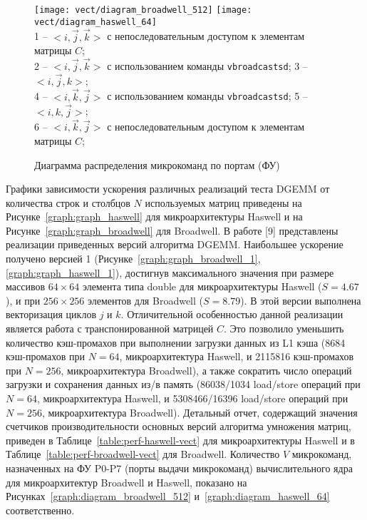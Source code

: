 \begin{figure}
	\centering
	{\texttt{[image: vect/diagram\_broadwell\_512]}}
	{\texttt{[image: vect/diagram\_haswell\_64]}} \\
	 1 -- $<i, \vec{j}, \vec{k}>$ с непоследовательным доступом к элементам матрицы $C$; \\
	 2 -- $<i, \vec{j}, \vec{k}>$ с использованием команды \texttt{vbroadcastsd}; 3 -- $<i, \vec{j}, k>$; \\
	 4 -- $<i, \vec{k}, \vec{j}>$ с использованием команды \texttt{vbroadcastsd}; 5 -- $<i, k, \vec{j}>$; \\
	 6 -- $<i, \vec{k}, \vec{j}>$ с непоследовательным доступом к элементам матрицы $C$;
    \caption{Диаграмма распределения микрокоманд по портам (ФУ)}
    \label{graph:vect-diagram}
\end{figure}

Графики зависимости ускорения различных реализаций теста DGEMM от количества строк и столбцов $N$ используемых матриц приведены на Рисунке~\ref{graph:graph_haswell} для микроархитектуры Haswell и на Рисунке~\ref{graph:graph_broadwell} для Broadwell. В работе [9] представлены реализации приведенных версий алгоритма DGEMM. Наибольшее ускорение получено версией 1 (Рисунке~\ref{graph:graph_broadwell_1}, \ref{graph:graph_haswell_1}), достигнув максимального значения при размере массивов $64 \times 64$ элемента типа double для микроархитектуры Haswell ($S = 4.67$), и при $256 \times 256$ элементов для Broadwell ($S = 8.79$). В этой версии выполнена векторизация циклов $j$ и $k$. Отличительной особенностью данной реализации является работа с транспонированной матрицей $C$. Это позволило уменьшить количество кэш-промахов при выполнении загрузки данных из L1 кэша (8684 кэш-промахов при $N = 64$, микроархитектура Haswell, и 2115816 кэш-промахов при $N = 256$, микроархитектура Broadwell), а также сократить число операций загрузки и сохранения данных из/в память (86038/1034 load/store операций при $N = 64$, микроархитектура Haswell, и 5308466/16396 load/store операций при $N = 256$, микроархитектура Broadwell). Детальный отчет, содержащий значения счетчиков производительности основных версий алгоритма умножения матриц, приведен в Таблице~\ref{table:perf-haswell-vect} для микроархитектуры Haswell и в Таблице~\ref{table:perf-broadwell-vect} для Broadwell. Количество $V$ микрокоманд, назначенных на ФУ P0-P7 (порты выдачи микрокоманд) вычислительного ядра для микроархитектур  Broadwell и Haswell, показано на Рисунках~\ref{graph:diagram_broadwell_512} и~\ref{graph:diagram_haswell_64} соответственно.

